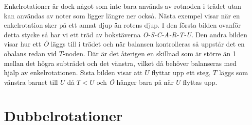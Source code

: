 \documentclass[a5paper,10pt,oneside]{article}
\begin{document}
Enkelrotationer är dock något som inte bara används av rotnoden i trädet utan kan användas av noter som ligger längre ner också. Nästa exempel visar när en enkelrotation sker på ett annat djup än rotens djup. I den första bilden ovanför detta stycke så har vi ett träd av bokstäverna \textit{O-S-C-A-R-T-U}. Den andra bilden visar hur ett \textit{Ö} läggs till i trädet och när balansen kontrolleras så uppstår det en obalans redan vid $T$-noden. Där är det återigen en skillnad som är större än 1 mellan det högra subträdet och det vänstra, vilket då behöver balanseras med hjälp av enkelrotationen. Sista bilden visar att $U$ flyttar upp ett steg, $T$ läggs som vänstra barnet till $U$ då $T < U$ och \textit{Ö} hänger bara på när $U$ flyttas upp. 

\section*{Dubbelrotationer}
\end{document}
